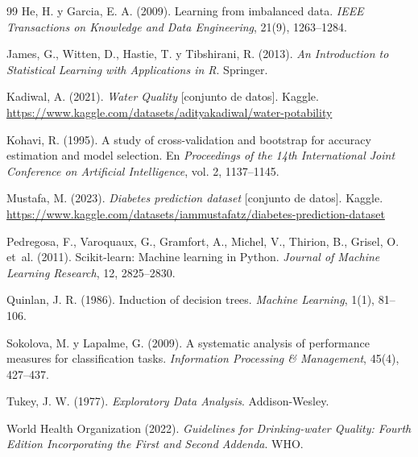 \documentclass[11pt,a4paper]{article}
\begin{document}
\begin{thebibliography}{99}
He, H. y Garcia, E. A. (2009). Learning from imbalanced data. \textit{IEEE Transactions on Knowledge and Data Engineering}, 21(9), 1263--1284.

James, G., Witten, D., Hastie, T. y Tibshirani, R. (2013). \textit{An Introduction to Statistical Learning with Applications in R}. Springer.

Kadiwal, A. (2021). \textit{Water Quality} [conjunto de datos]. Kaggle. \url{https://www.kaggle.com/datasets/adityakadiwal/water-potability}

Kohavi, R. (1995). A study of cross-validation and bootstrap for accuracy estimation and model selection. En \textit{Proceedings of the 14th International Joint Conference on Artificial Intelligence}, vol. 2, 1137--1145.

Mustafa, M. (2023). \textit{Diabetes prediction dataset} [conjunto de datos]. Kaggle. \url{https://www.kaggle.com/datasets/iammustafatz/diabetes-prediction-dataset}

Pedregosa, F., Varoquaux, G., Gramfort, A., Michel, V., Thirion, B., Grisel, O. et~al. (2011). Scikit-learn: Machine learning in Python. \textit{Journal of Machine Learning Research}, 12, 2825--2830.

Quinlan, J. R. (1986). Induction of decision trees. \textit{Machine Learning}, 1(1), 81--106.

Sokolova, M. y Lapalme, G. (2009). A systematic analysis of performance measures for classification tasks. \textit{Information Processing \& Management}, 45(4), 427--437.

Tukey, J. W. (1977). \textit{Exploratory Data Analysis}. Addison-Wesley.

World Health Organization (2022). \textit{Guidelines for Drinking-water Quality: Fourth Edition Incorporating the First and Second Addenda}. WHO.

\end{thebibliography}
\end{document}
